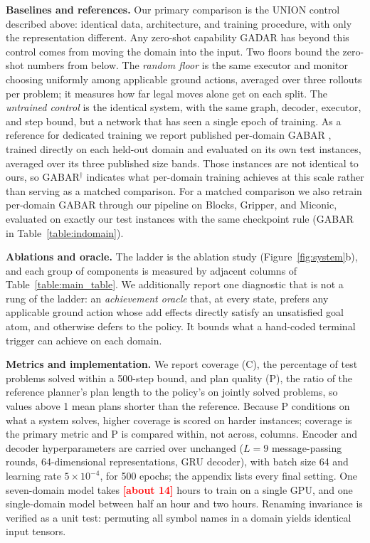 \documentclass[letterpaper]{article} %
\newcommand{\gadar}{GADAR}                 %
\newcommand{\union}{UNION}                 %
\newcommand{\todonum}[1]{\textcolor{red}{\textbf{[#1]}}}
\begin{document}
\textbf{Baselines and references.} Our primary comparison is the \union{}
control described above: identical data, architecture, and training
procedure, with only the representation different. Any zero-shot
capability \gadar{} has beyond this control comes from moving the domain
into the input. Two floors bound the zero-shot numbers from below. The
\emph{random floor} is the same executor and monitor choosing uniformly
among applicable ground actions, averaged over three rollouts per problem;
it measures how far legal moves alone get on each split. The
\emph{untrained control} is the identical system, with the same graph,
decoder, executor, and step bound, but a network that has seen a single
epoch of training. As a reference for dedicated training we report
published per-domain GABAR \citep{gabar}, trained directly on each
held-out domain and evaluated on its own test instances, averaged over its
three published size bands. Those instances are not identical to ours, so
GABAR$^\dagger$ indicates what per-domain training achieves at this scale
rather than serving as a matched comparison. For a matched comparison we
also retrain per-domain GABAR through our pipeline on Blocks, Gripper, and
Miconic, evaluated on exactly our test instances with the same checkpoint
rule (GABAR in Table~\ref{table:indomain}).

\textbf{Ablations and oracle.} The ladder is the ablation study
(Figure~\ref{fig:system}b), and each group of components is measured by
adjacent columns of Table~\ref{table:main_table}. We additionally report
one diagnostic that is not a rung of the ladder: an \emph{achievement
oracle} that, at every state, prefers any applicable ground action whose
add effects directly satisfy an unsatisfied goal atom, and otherwise defers
to the policy. It bounds what a hand-coded terminal trigger can achieve on
each domain.

\textbf{Metrics and implementation.} We report coverage (C), the
percentage of test problems solved within a 500-step bound, and
plan quality (P), the ratio of the reference planner's plan length to the
policy's on jointly solved problems, so values above 1 mean plans shorter
than the reference. Because P conditions on what a system solves, higher
coverage is scored on harder instances; coverage is the primary metric and
P is compared within, not across, columns. Encoder and decoder
hyperparameters are carried over unchanged ($L{=}9$
message-passing rounds, 64-dimensional representations, GRU decoder), with
batch size 64 and learning rate $5{\times}10^{-4}$, for 500 epochs; the
appendix lists every final setting. One seven-domain model takes
\todonum{about 14} hours to train on a single GPU, and one single-domain
model between half an hour and two hours. Renaming invariance is
verified as a unit test: permuting all symbol names in a domain yields
identical input tensors.
\end{document}
